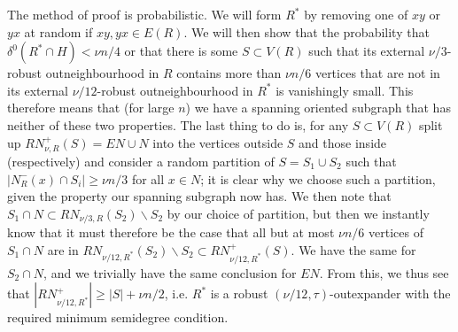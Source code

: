 \documentclass[10pt,letterpaper, reqno]{amsart}
\theoremstyle{definition}
\numberwithin{equation}{section}
\begin{document}
\noindent The method of proof is probabilistic. We will form $R^*$ by removing one of $xy$ or $yx$ at random if $xy,yx \in E(R)$. We will then show that the probability that $\delta^0(R^* \cap H) < \nu n /4$ or that there is some $S \subset V(R)$ such that its external $\nu/3$-robust outneighbourhood in $R$ contains more than $\nu n/6$ vertices that are not in its external $\nu/12$-robust outneighbourhood in $R^*$ is vanishingly small. This therefore means that (for large $n$) we have a spanning oriented subgraph that has neither of these two properties. The last thing to do is, for any $S \subset V(R)$ split up $RN_{\nu,R}^+(S) = EN \cup N$ into the vertices outside $S$ and those inside (respectively) and consider a random partition of $S = S_1 \cup S_2$ such that $|N_R^-(x) \cap S_i| \geq \nu n/3$ for all $x \in N$; it is clear why we choose such a partition, given the property our spanning subgraph now has. We then note that $S_1 \cap N \subset RN_{\nu/3,R}(S_2)\backslash S_2$ by our choice of partition, but then we instantly know that it must therefore be the case that all but at most $\nu n/6$ vertices of $S_1 \cap N$ are in $RN_{\nu/12,R^*}(S_2) \backslash S_2 \subset  RN^+_{\nu/12,  R^*}(S)$. We have the same for $S_2 \cap N$, and we trivially have the same conclusion for $EN$. From this, we thus see that $|RN^+_{\nu/12, R^*}| \geq |S| + \nu n/2$, i.e. $R^*$ is a robust $(\nu/12,\tau)$-outexpander with the required minimum semidegree condition.
\end{document}
